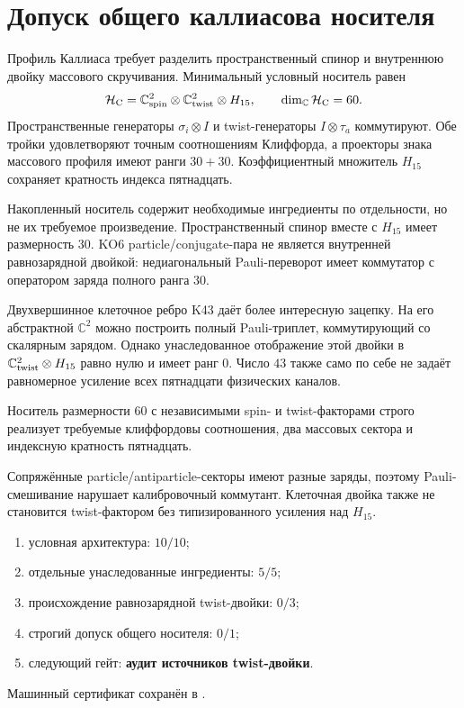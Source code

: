 \chapter{Допуск общего каллиасова носителя}
\label{ch:v10-particle-wrinkle-dislocation-callias-carrier}

Профиль Каллиаса требует разделить пространственный спинор и внутреннюю
двойку массового скручивания. Минимальный условный носитель равен
\begin{equation}
 \mathcal H_{\rm C}
 =\mathbb C^2_{\rm spin}\otimes
  \mathbb C^2_{\rm twist}\otimes H_{15},
 \qquad \dim_{\mathbb C}\mathcal H_{\rm C}=60.
\end{equation}
Пространственные генераторы $\sigma_i\otimes I$ и twist-генераторы
$I\otimes\tau_a$ коммутируют. Обе тройки удовлетворяют точным соотношениям
Клиффорда, а проекторы знака массового профиля имеют ранги $30+30$.
Коэффициентный множитель $H_{15}$ сохраняет кратность индекса пятнадцать.

Накопленный носитель содержит необходимые ингредиенты по отдельности, но
не их требуемое произведение. Пространственный спинор вместе с $H_{15}$
имеет размерность $30$. KO6 particle/conjugate-пара не является внутренней
равнозарядной двойкой: недиагональный Pauli-переворот имеет коммутатор с
оператором заряда полного ранга $30$.

Двухвершинное клеточное ребро K43 даёт более интересную зацепку. На его
абстрактной $\mathbb C^2$ можно построить полный Pauli-триплет, коммутирующий
со скалярным зарядом. Однако унаследованное отображение этой двойки в
$\mathbb C^2_{\rm twist}\otimes H_{15}$ равно нулю и имеет ранг $0$.
Число $43$ также само по себе не задаёт равномерное усиление всех
пятнадцати физических каналов.

\begin{theorem}
Носитель размерности $60$ с независимыми spin- и twist-факторами строго
реализует требуемые клиффордовы соотношения, два массовых сектора и
индексную кратность пятнадцать.
\end{theorem}
\begin{nogocriterion}
Сопряжённые particle/antiparticle-секторы имеют разные заряды, поэтому
Pauli-смешивание нарушает калибровочный коммутант. Клеточная двойка также
не становится twist-фактором без типизированного усиления над $H_{15}$.
\end{nogocriterion}
\begin{protocol}\begin{enumerate}
\item условная архитектура: \textbf{$10/10$};
\item отдельные унаследованные ингредиенты: \textbf{$5/5$};
\item происхождение равнозарядной twist-двойки: \textbf{$0/3$};
\item строгий допуск общего носителя: \textbf{$0/1$};
\item следующий гейт: \textbf{аудит источников twist-двойки}.
\end{enumerate}\end{protocol}
Машинный сертификат сохранён в
.